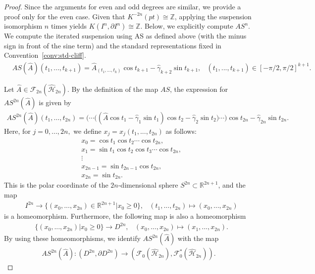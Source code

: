 \documentclass{amsart}
\theoremstyle{definition}
\theoremstyle{remark}
\begin{document}
\begin{proof}
Since the arguments for even and odd degrees are similar, we provide a proof only for the even case. Given that $K^{-2n}(pt) \cong \mathbb{Z}$, applying the suspension isomorphism $n$ times yields $K(I^n, \partial I^n) \cong \mathbb{Z}$. Below, we explicitly compute $AS^n$. We compute the iterated suspension using $\mathrm{AS}$ as defined above (with the minus sign in front of the sine term) and the standard representations fixed in Convention~\ref{conv:std-cliff}.
\begin{align*}
&AS(\hat{A})(t_1,...,t_{k+1}) = \hat{A}_{(t_1,...,t_k)} \cos{t_{k+1}} - \hat{\gamma}_{k+2} \sin{t_{k+1}},
&(t_1,...,t_{k+1})\in [-\pi/2,\pi/2]^{k+1}.
\end{align*}

Let $\hat{A} \in \mathcal{F}_{2n}(\hat{\mathcal{H}}_{2n})$. By the definition of the map $AS$, the expression for $AS^{2n}(\hat{A})$ is given by
\begin{align*}
AS^{2n}(\hat{A})(t_1, \dots, t_{2n}) = \big( \cdots \big( (\hat{A} \cos{t_1} - \hat{\gamma}_1 \sin{t_1}) \cos{t_2} - \hat{\gamma}_2 \sin{t_2} \big) \cdots \big) \cos{t_{2n}} - \hat{\gamma}_{2n} \sin{t_{2n}}.
\end{align*}
Here, for $j = 0, ..., 2n,$ we define $x_j = x_j(t_1, ..., t_{2n})$ as follows:
\begin{align*}
&x_0=\cos{t_1}\cos{t_2}\cdots \cos{t_{2n}},\\
&x_1=\sin{t_1}\cos{t_2}\cos{t_3}\cdots \cos{t_{2n}},\\
&\vdots\\
&x_{2n-1}=\sin{t_{2n-1}}\cos{t_{2n}},\\
&x_{2n}=\sin{t_{2n}}.
\end{align*}
This is the polar coordinate of the $2n$-dimensional sphere $S^{2n}\subset \mathbb{R}^{2n+1}$, and the map
\begin{align*}
&I^{2n} \to \{(x_0,...,x_{2n})\in \mathbb{R}^{2n+1}|x_0\ge 0\},&(t_1,...,t_{2n})\mapsto (x_0,...,x_{2n})
\end{align*}
is a homeomorphism. Furthermore, the following map is also a homeomorphism
\begin{align*}
&\{(x_0,...,x_{2n})|x_0\ge 0\} \to D^{2n}, &(x_0,...,x_{2n})\mapsto (x_1,...,x_{2n}).
\end{align*}
By using these homeomorphisms, we identify $AS^{2n}(\hat{A})$ with the map
\begin{align*}
AS^{2n}(\hat{A})\colon (D^{2n},\partial D^{2n})\to (\mathcal{F}_0(\hat{\mathcal{H}}_{2n}), \mathcal{F}_0^{*}(\hat{\mathcal{H}}_{2n})).

\end{align*}
\end{proof}
\end{document}
